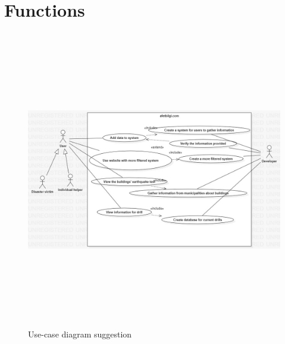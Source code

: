 \documentclass[12pt]{report}
\begin{document}
\section{Functions}

\begin{figure}[H]
    \includegraphics[width=17cm, height=13cm]{use-case2}
    \centering
    \caption{Use-case diagram suggestion}
\end{figure}
\end{document}
